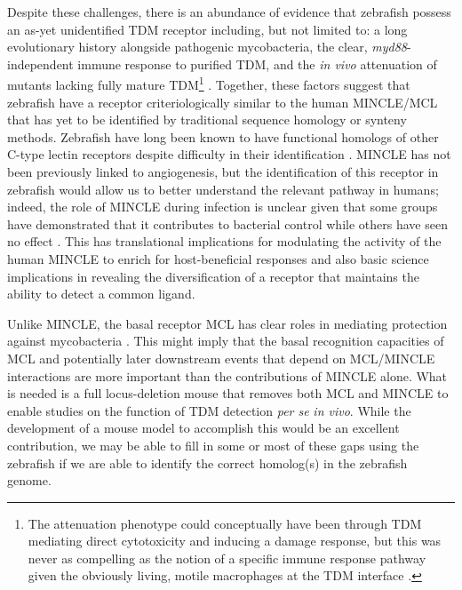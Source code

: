 Despite these challenges, there is an abundance of evidence that zebrafish possess an as\hyp{}yet unidentified TDM receptor including, but not limited to: a long evolutionary history alongside pathogenic mycobacteria, the clear, \textit{myd88}\hyp{}independent immune response to purified TDM, and the \textit{in vivo} attenuation of mutants lacking fully mature TDM\footnote{The attenuation phenotype could conceptually have been through TDM mediating direct cytotoxicity and inducing a damage response, but this was never as compelling as the notion of a specific immune response pathway given the obviously living, motile macrophages at the TDM interface \citep{Bloch1953, Noll1956b, Walton2018}.} \citep{Rao2005, Walton2018}. Together, these factors suggest that zebrafish have a receptor criteriologically similar to the human MINCLE/MCL that has yet to be identified by traditional sequence homology or synteny methods. Zebrafish have long been known to have functional homologs of other C\hyp{}type lectin receptors despite difficulty in their identification \citep{Yoder2004, Panagos2006, Petit2019}. MINCLE has not been previously linked to angiogenesis, but the identification of this receptor in zebrafish would allow us to better understand the relevant pathway in humans; indeed, the role of MINCLE during infection is unclear given that some groups have demonstrated that it contributes to bacterial control \citep{Behler2012, Lee2012, Behler2015, Wilson2015} while others have seen no effect \citep{Heitmann2013}. This has translational implications for modulating the activity of the human MINCLE to enrich for host\hyp{}beneficial responses and also basic science implications in revealing the diversification of a receptor that maintains the ability to detect a common ligand. 

Unlike MINCLE, the basal receptor MCL has clear roles in mediating protection against mycobacteria \citep{Wilson2015}. This might imply that the basal recognition capacities of MCL and potentially later downstream events that depend on MCL/MINCLE interactions are more important than the contributions of MINCLE alone. What is needed is a full locus\hyp{}deletion mouse that removes both MCL and MINCLE to enable studies on the function of TDM detection \textit{per se} \textit{in vivo}. While the development of a mouse model to accomplish this would be an excellent contribution, we may be able to fill in some or most of these gaps using the zebrafish if we are able to identify the correct homolog(s) in the zebrafish genome.

